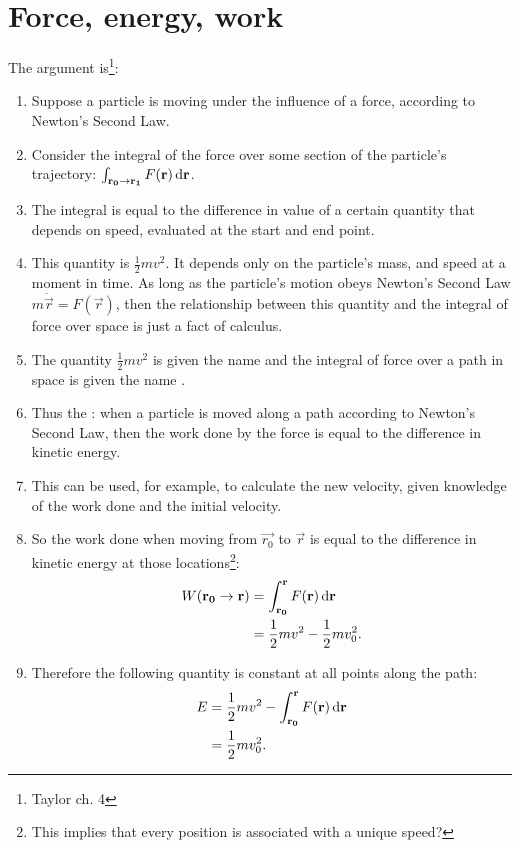 \renewcommand{\r}{\vec{r}}

\section{Force, energy, work}
The argument is\footnote{Taylor ch. 4}:

\begin{enumerate}
\item Suppose a particle is moving under the influence of a force, according to Newton's Second Law.
\item Consider the integral of the force over some section of the particle's trajectory:
  $\int_{\vec{r_0 \to \vec{r_1}}} F(\vec{r}) \dif \vec{r}$.
\item The integral is equal to the difference in value of a certain quantity that depends on speed,
  evaluated at the start and end point.
\item This quantity is $\frac{1}{2}mv^2$. It depends only on the particle's mass, and speed at a
  moment in time. As long as the particle's motion obeys Newton's Second Law
  $m\ddot{\vec{r}} = F(\vec{r})$, then the relationship between this quantity and the integral of
  force over space is just a fact of calculus.
\item The quantity $\frac{1}{2}mv^2$ is given the name  and the integral of
  force over a path in space is given the name .
\item Thus the : when a particle is moved along a path according to Newton's
  Second Law, then the work done by the force is equal to the difference in kinetic energy.
\item This can be used, for example, to calculate the new velocity, given knowledge of the work done
  and the initial velocity.
\item So the work done when moving from $\vec{r_0}$ to $\vec{r}$ is equal to the difference in
  kinetic energy at those locations\footnote{This implies that every position is associated with a
    unique speed?}:
  \begin{align*}
    W(\vec{r_0} \to \vec{r})
    &= \int_{\vec{r_0}}^{\vec{r}} F(\vec{r}) \dif \vec{r} \\
    &= \frac{1}{2}mv^2 - \frac{1}{2}mv_0^2.
  \end{align*}
\item Therefore the following quantity is constant at all points along the path:
  \begin{align*}
    E
    &= \frac{1}{2}mv^2 - \int_{\vec{r_0}}^{\vec{r}} F(\vec{r}) \dif \vec{r} \\
    &= \frac{1}{2}mv_0^2.
  \end{align*}
\end{enumerate}




